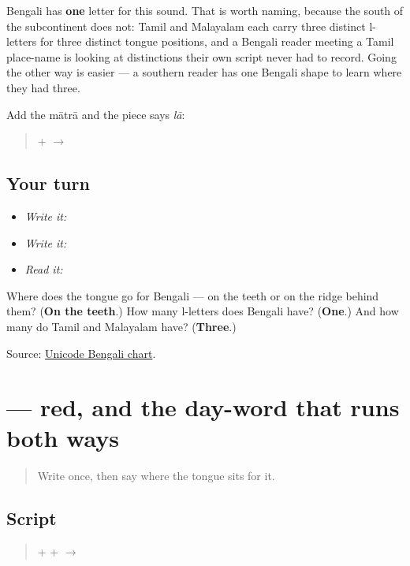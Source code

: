 Bengali has \textbf{one} letter for this sound. That is worth naming, because the south of the subcontinent does not: Tamil and Malayalam each carry three distinct l-letters for three distinct tongue positions, and a Bengali reader meeting a Tamil place-name is looking at distinctions their own script never had to record. Going the other way is easier — a southern reader has one Bengali shape to learn where they had three.

Add the mātrā and the piece says \emph{lā}:

\begin{quote}
\textbf{} + \textbf{} $\to$ \textbf{}
\end{quote}

\subsection*{Your turn}
\begin{itemize}
\raggedright
  \item \emph{Write it:} 
  \item \emph{Write it:} 
  \item \emph{Read it:} 
\end{itemize}

\begin{tcolorbox}[breakable,colback=teal!4,colframe=teal!35!black,title={Before you move on}]
Where does the tongue go for Bengali \textbf{} — on the teeth or on the ridge behind them? (\textbf{On the teeth}.) How many l-letters does Bengali have? (\textbf{One}.) And how many do Tamil and Malayalam have? (\textbf{Three}.)

Source: \href{https://www.unicode.org/charts/PDF/U0980.pdf}{Unicode Bengali chart}.
\end{tcolorbox}
\section[lāl]{ — red, and the day-word that runs both ways}

\label{lesson:BN-W02-lal-read}



\begin{quote}
Write \textbf{} once, then say where the tongue sits for it.
\end{quote}

\subsection*{Script}
\begin{quote}
\textbf{} + \textbf{} + \textbf{} $\to$ \textbf{}
\end{quote}

